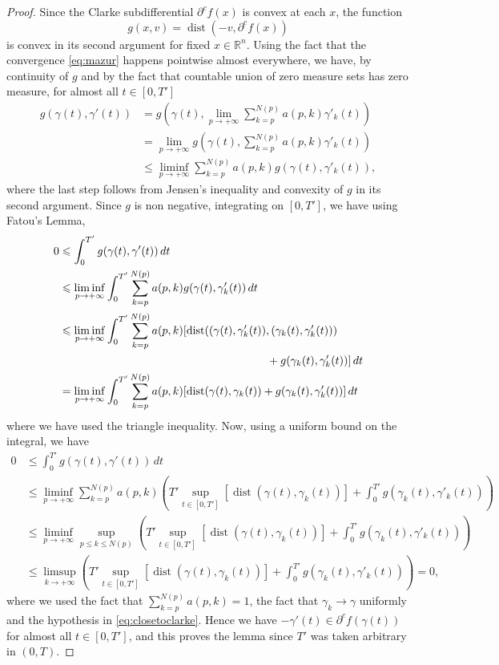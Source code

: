 \documentclass[11pt]{article}
\theoremstyle{definition}
\theoremstyle{remark}
\DeclareMathOperator{\dist}{dist}
\newcommand{\R}{\mathbb{R}}
\renewcommand{\leq}{\leqslant}
\begin{document}
\begin{proof}
%
%
%
%
%
%
%
%
%
%
%
%


 Since the Clarke subdifferential $\partial^cf(x)$ is convex at each $x$, the function 
  \[g(x,v)=\dist(-v,\partial^cf(x))\]
 is convex in its second argument for fixed $x \in \R^n$.    Using the fact that the convergence \eqref{eq:mazur} happens pointwise almost everywhere, we have, by continuity of $g$ and by the fact that countable union of zero measure sets has zero measure, for almost all $t \in [0, T']$
 \begin{align*}
  g(\gamma(t),\gamma'(t)) &=g({\gamma(t),\lim_{p\to+\infty}\textstyle\sum_{k=p}^{N(p)}a(p,k)\gamma'_k(t)})\\
  &=\lim_{p\to+\infty}g({\textstyle\gamma(t),\sum_{k=p}^{N(p)}a(p,k)\gamma'_k(t)})\\
  &\leq \liminf_{p\to+\infty} \sum_{k=p}^{N(p)}a(p,k)g(\gamma(t),\gamma'_k(t)),
 \end{align*}
 where the last step follows from Jensen's inequality and convexity of $g$ in its second argument.
 Since $g$ is non negative, integrating on $[0,T']$, we have using Fatou's Lemma, 
 \begin{align*}
  0&\leq \int_0^{T'}g(\gamma(t),\gamma'(t))\,dt\\
  &\leq \liminf_{p\to+\infty}\int_0^{T'}\sum_{k=p}^{N(p)}a(p,k)g(\gamma(t),\gamma'_k(t))\,dt\\
  &\leq\liminf_{p\to+\infty}\int_0^{T'}\sum_{k=p}^{N(p)}a(p,k)[\dist((\gamma(t),\gamma'_k(t)),(\gamma_k(t),\gamma'_k(t)))\\
  &\hspace{6.5cm}+g(\gamma_k(t),\gamma'_k(t))]\,dt\\
  &=\liminf_{p\to+\infty}\int_0^{T'}\sum_{k=p}^{N(p)}a(p,k)[\dist(\gamma(t),\gamma_k(t))+g(\gamma_k(t),\gamma'_k(t))]\,dt\\
   \end{align*}
 where we have used the triangle inequality.
 Now, using a uniform bound on the integral, we have 
 \begin{align*}
  0&\leq \int_0^{T'}g(\gamma(t),\gamma'(t))\,dt\\
  &\leq\liminf_{p\to+\infty}\sum_{k=p}^{N(p)}a(p,k)\left(T'\sup_{t\in[0,T']}[\dist(\gamma(t),\gamma_k(t))]+ \int_0^{T'} g(\gamma_k(t),\gamma'_k(t))\right)\\
  &\leq \liminf_{p\to+\infty}\sup_{p\leq k\leq N(p)}\left(T'\sup_{t\in[0,T']}[\dist(\gamma(t),\gamma_k(t))]+ \int_0^{T'} g(\gamma_k(t),\gamma'_k(t))\right)\\
  &\leq \limsup_{k\to+\infty} \left(T'\sup_{t\in[0,T']}[\dist(\gamma(t),\gamma_k(t))]+ \int_0^{T'} g(\gamma_k(t),\gamma'_k(t))\right)=0,
 \end{align*}
%
%
%
%
%
%
%
%
%
%
 where we used the fact that $\sum_{k=p}^{N(p)}a(p,k)=1$, the fact
 that $\gamma_k\to\gamma$ uniformly and the hypothesis in \eqref{eq:closetoclarke}. Hence we have $-\gamma'(t)\in\partial^cf(\gamma(t))$ for almost all $t\in[0,T']$, and this proves the lemma since $T'$ was taken arbitrary in $(0,T)$.
\end{proof}
\end{document}
